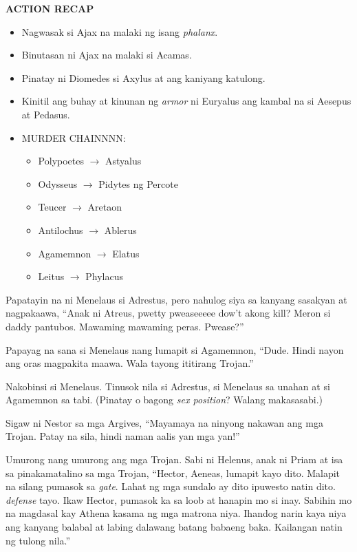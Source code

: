 \documentclass[12pt,letterpaper]{report}
\newenvironment{recap}{\begin{center}{\large\textbf{ACTION RECAP}}\begin{itemize}}{\end{itemize}\end{center}}
\newcommand{\killchain}[2]{#1 $\rightarrow$ #2}
\begin{document}
\begin{recap}
    \item Nagwasak si Ajax na malaki ng isang \textit{phalanx}.
    \item Binutasan ni Ajax na malaki si Acamas.
    \item Pinatay ni Diomedes si Axylus at ang kaniyang katulong.
    \item Kinitil ang buhay at kinunan ng \textit{armor} ni Euryalus ang kambal na si Aesepus at Pedasus.
    \item MURDER CHAINNNN:
    \begin{itemize}
        \item \killchain{Polypoetes}{Astyalus}
        \item \killchain{Odysseus}{Pidytes ng Percote}
        \item \killchain{Teucer}{Aretaon}
        \item \killchain{Antilochus}{Ablerus}
        \item \killchain{Agamemnon}{Elatus}
        \item \killchain{Leitus}{Phylacus}
    \end{itemize}
\end{recap}

Papatayin na ni Menelaus si Adrestus, pero nahulog siya sa kanyang sasakyan at nagpakaawa, ``Anak ni Atreus, pwetty pweaseeeee dow't akong kill? Meron si daddy pantubos. Mawaming mawaming peras. Pwease?''

Papayag na sana si Menelaus nang lumapit si Agamemnon, ``Dude. Hindi nayon ang oras magpakita maawa. Wala tayong  ititirang Trojan.''

Nakobinsi si Menelaus. Tinusok nila si Adrestus, si Menelaus sa unahan at si Agamemnon sa tabi. (Pinatay o bagong \textit{sex position}? Walang makasasabi.)

Sigaw ni Nestor sa mga Argives, ``Mayamaya na ninyong nakawan ang mga Trojan. Patay na sila, hindi naman aalis yan mga yan!''

Umurong nang umurong ang mga Trojan. Sabi ni Helenus, anak ni Priam at isa sa pinakamatalino sa mga Trojan, ``Hector, Aeneas, lumapit kayo dito. Malapit na silang pumasok sa \textit{gate}. Lahat ng mga sundalo ay dito ipuwesto natin dito. \textit{defense} tayo. Ikaw Hector, pumasok ka sa loob at hanapin mo si inay. Sabihin mo na magdasal kay Athena kasama ng mga matrona niya. Ihandog narin kaya niya ang kanyang balabal at labing dalawang batang babaeng baka. Kailangan natin ng tulong nila.''
\end{document}
